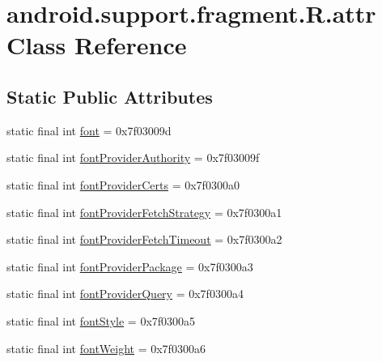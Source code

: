 \hypertarget{classandroid_1_1support_1_1fragment_1_1R_1_1attr}{}\section{android.\+support.\+fragment.\+R.\+attr Class Reference}
\label{classandroid_1_1support_1_1fragment_1_1R_1_1attr}
\subsection*{Static Public Attributes}
\begin{DoxyCompactItemize}
\item 
static final int \mbox{\hyperlink{classandroid_1_1support_1_1fragment_1_1R_1_1attr_ade8c890db04a0ca4fdb5dede45184b20}{font}} = 0x7f03009d
\item 
static final int \mbox{\hyperlink{classandroid_1_1support_1_1fragment_1_1R_1_1attr_a6a21a3f7bd07752d2c3ed2140e90171a}{font\+Provider\+Authority}} = 0x7f03009f
\item 
static final int \mbox{\hyperlink{classandroid_1_1support_1_1fragment_1_1R_1_1attr_a95ec7b1611790860e7f63a3f482e2da6}{font\+Provider\+Certs}} = 0x7f0300a0
\item 
static final int \mbox{\hyperlink{classandroid_1_1support_1_1fragment_1_1R_1_1attr_a811d39f2d60dad7005ceaa4a50081857}{font\+Provider\+Fetch\+Strategy}} = 0x7f0300a1
\item 
static final int \mbox{\hyperlink{classandroid_1_1support_1_1fragment_1_1R_1_1attr_ab22f7ae6227babc9982d5cd8424b4569}{font\+Provider\+Fetch\+Timeout}} = 0x7f0300a2
\item 
static final int \mbox{\hyperlink{classandroid_1_1support_1_1fragment_1_1R_1_1attr_ab9c71c3f4d3b81bd0242122a5fd9a69d}{font\+Provider\+Package}} = 0x7f0300a3
\item 
static final int \mbox{\hyperlink{classandroid_1_1support_1_1fragment_1_1R_1_1attr_a26f816c1cff308c8421bd73d47a628d8}{font\+Provider\+Query}} = 0x7f0300a4
\item 
static final int \mbox{\hyperlink{classandroid_1_1support_1_1fragment_1_1R_1_1attr_af1bea947c37a493d555964ec7da45301}{font\+Style}} = 0x7f0300a5
\item 
static final int \mbox{\hyperlink{classandroid_1_1support_1_1fragment_1_1R_1_1attr_aa1c78e37abb086b77be7428e9f8a0f3a}{font\+Weight}} = 0x7f0300a6
\end{DoxyCompactItemize}


